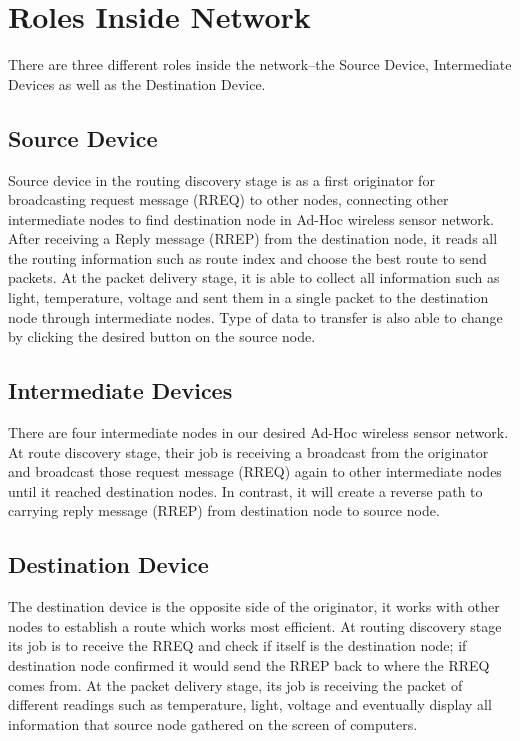 \section{Roles Inside Network}
\label{sec:architecture}
There are three different roles inside the network--the Source Device, Intermediate Devices as well as the Destination Device.

\subsection{Source Device}
Source device in the routing discovery stage is as a first originator for broadcasting request message (RREQ) to other nodes, connecting other intermediate nodes to find destination node in Ad-Hoc wireless sensor network. After receiving a Reply message (RREP) from the destination node, it reads all the routing information such as route index and choose the best route to send packets. At the packet delivery stage, it is able to collect all information such as light, temperature, voltage and sent them in a single packet to the destination node through intermediate nodes. Type of data to transfer is also able to change by clicking the desired button on the source node.

\subsection{Intermediate Devices}
There are four intermediate nodes in our desired Ad-Hoc wireless sensor network. At route discovery stage, their job is receiving a broadcast from the originator and broadcast those request message (RREQ) again to other intermediate nodes until it reached destination nodes. In contrast, it will create a reverse path to carrying reply message (RREP) from destination node to source node.

\subsection{Destination Device}
The destination device is the opposite side of the originator, it works with other nodes to establish a route which works most efficient. At routing discovery stage its job is to receive the RREQ and check if itself is the destination node; if destination node confirmed it would send the RREP back to where the RREQ comes from. At the packet delivery stage, its job is receiving the packet of different readings such as temperature, light, voltage and eventually display all information that source node gathered on the screen of computers.

